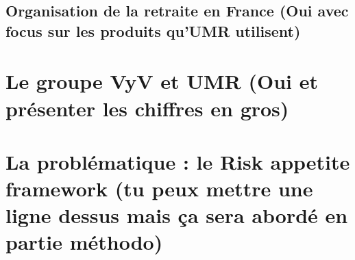 \subsection{Organisation de la retraite en France (Oui avec focus sur les produits qu'UMR utilisent)}


\section{Le groupe VyV et UMR (Oui et présenter les chiffres en gros)}
\label{sec:groupe_vyv_umr}


\section{La problématique : le Risk appetite framework (tu peux mettre une ligne dessus mais ça sera abordé en partie méthodo)} 
\label{sec:problematique_risk_appetite_framework}



